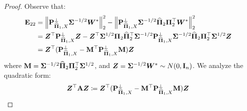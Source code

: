 \documentclass[numsec,webpdf,modern,medium,namedate]{oup-authoring-template}
\theoremstyle{thmstyleone}%
\theoremstyle{thmstyletwo}%
\theoremstyle{thmstylethree}%
\begin{document}
\begin{proof}
Observe that:
    \begin{equation}
\begin{split}
\bE_{22} & = \left\| \bP_{\hatPi_1, X}^\perp {\bSig}^{-1/2} \bW^\ast \right\|_2^2
- \left\| \bP_{\hatPi_1, X}^\perp {\bSig}^{-1/2} \hatPi_2 {\bPi}_2^\top \bW^\ast \right\|_2^2\\
& =  \bZ^\top \bP_{\hatPi_1, X}^\perp \bZ 
- \bZ^\top {\bSig}^{1/2} {\bPi}_2 \hatPi_2^\top {\bSig}^{-1/2} \bP_{\hatPi_1, X}^\perp {\bSig}^{-1/2} \hatPi_2 {\bPi}_2^\top {\bSig}^{1/2} \bZ \\
& = \bZ^\top (\bP_{\hatPi_1, X}^\perp - \bM^\top \bP_{\hatPi_1, X}^\perp \bM)\bZ
\end{split}
\end{equation}
where $\bM = {\bSig}^{-1/2} \hatPi_2 {\bPi}_2^\top {\bSig}^{1/2}$, and $ \bZ= {\bSig}^{-1/2}\bW^\ast \sim N(0, \bI_n)$. We analyze the quadratic form:
\begin{equation}\label{eq:E22}
\bZ^\top \bA \bZ \coloneqq \bZ^\top (\bP_{\hatPi_1, X}^\perp - \bM^\top \bP_{\hatPi_1, X}^\perp \bM)\bZ
\end{equation}


\end{proof}
\end{document}
